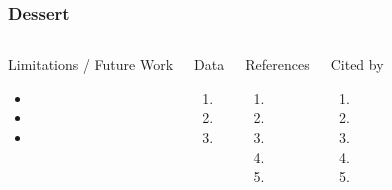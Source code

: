 \documentclass[aspectratio=169]{beamer}
\begin{document}
\begin{frame}[label=third-part]
\frametitle{Dessert}
 
  \begin{columns}[T]

    \begin{alertblock}{Limitations / Future Work}
      \begin{itemize}
      \item 
      \item 
      \item 
      \end{itemize}
    \end{alertblock}


    \begin{block}{Data}
      \begin{enumerate}
      \item 
      \item 
      \item 
      \end{enumerate}
    \end{block}   
    

    \begin{exampleblock}{References}
      \begin{enumerate}
      \item 
      \item 
      \item
      \item
      \item
      \end{enumerate}
    \end{exampleblock}


    \begin{exampleblock}{Cited by}
      \begin{enumerate}
      \item 
      \item 
      \item
      \item
      \item
      \end{enumerate}
    \end{exampleblock}
  \end{columns}

\end{frame}
\end{document}
